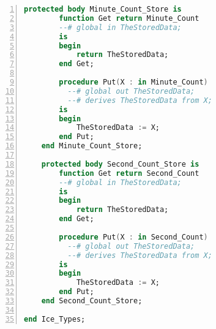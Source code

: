 \begin{lstlisting}[language=ada, gobble=0, numbers=left, caption={\lstinline{Ice_Types} package}]
    protected body Minute_Count_Store is
        function Get return Minute_Count
        --# global in TheStoredData;
        is
        begin
            return TheStoredData;
        end Get;

        procedure Put(X : in Minute_Count)
          --# global out TheStoredData;
          --# derives TheStoredData from X;
        is
        begin
            TheStoredData := X;
        end Put;
    end Minute_Count_Store;

    protected body Second_Count_Store is
        function Get return Second_Count
        --# global in TheStoredData;
        is
        begin
            return TheStoredData;
        end Get;

        procedure Put(X : in Second_Count)
          --# global out TheStoredData;
          --# derives TheStoredData from X;
        is
        begin
            TheStoredData := X;
        end Put;
    end Second_Count_Store;

end Ice_Types;
\end{lstlisting} 
\label{listing:pca_generated:ice_types}
\doublespacing


